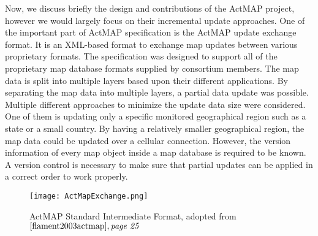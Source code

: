 Now, we discuss briefly the design and contributions of the ActMAP project, however we would largely focus on their incremental update approaches. One of the important part of ActMAP specification is the ActMAP update exchange format. It is an XML-based format to exchange map updates between various proprietary formats. The specification was designed to support all of the proprietary map database formats supplied by consortium members. The map data is split into multiple layers based upon their different applications. By separating the map data into multiple layers, a partial data update was possible. Multiple different approaches to minimize the update data size were considered. One of them is updating only a specific monitored geographical region such as a state or a small country. By having a relatively smaller geographical region, the map data could be updated over a cellular connection. However, the version information of every map object inside a map database is required to be known. A version control is necessary to make sure that partial updates can be applied in a correct order to work properly. \\

\begin{figure}
\texttt{[image: ActMapExchange.png]}
\caption{ActMAP Standard Intermediate Format, adopted from $\cite{flament2003actmap}, \textit{page 25}$}
\label{fg:actmap}
\end{figure}

